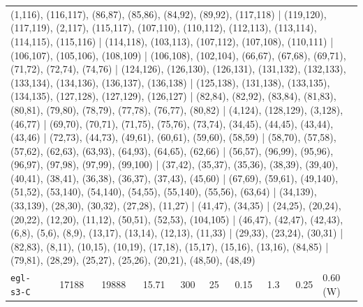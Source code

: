 \begin{longtable}{lrrrrrrrrl}
\multicolumn{10}{p{0.96\linewidth}}{\tiny\raggedright\arraybackslash (1,116), (116,117), (86,87), (85,86), (84,92), (89,92), (117,118) | (119,120), (117,119), (2,117), (115,117), (107,110), (110,112), (112,113), (113,114), (114,115), (115,116) | (114,118), (103,113), (107,112), (107,108), (110,111) | (106,107), (105,106), (108,109) | (106,108), (102,104), (66,67), (67,68), (69,71), (71,72), (72,74), (74,76) | (124,126), (126,130), (126,131), (131,132), (132,133), (133,134), (134,136), (136,137), (136,138) | (125,138), (131,138), (133,135), (134,135), (127,128), (127,129), (126,127) | (82,84), (82,92), (83,84), (81,83), (80,81), (79,80), (78,79), (77,78), (76,77), (80,82) | (4,124), (128,129), (3,128), (46,77) | (69,70), (70,71), (71,75), (75,76), (73,74), (34,45), (44,45), (43,44), (43,46) | (72,73), (44,73), (49,61), (60,61), (59,60), (58,59) | (58,70), (57,58), (57,62), (62,63), (63,93), (64,93), (64,65), (62,66) | (56,57), (96,99), (95,96), (96,97), (97,98), (97,99), (99,100) | (37,42), (35,37), (35,36), (38,39), (39,40), (40,41), (38,41), (36,38), (36,37), (37,43), (45,60) | (67,69), (59,61), (49,140), (51,52), (53,140), (54,140), (54,55), (55,140), (55,56), (63,64) | (34,139), (33,139), (28,30), (30,32), (27,28), (11,27) | (41,47), (34,35) | (24,25), (20,24), (20,22), (12,20), (11,12), (50,51), (52,53), (104,105) | (46,47), (42,47), (42,43), (6,8), (5,6), (8,9), (13,17), (13,14), (12,13), (11,33) | (29,33), (23,24), (30,31) | (82,83), (8,11), (10,15), (10,19), (17,18), (15,17), (15,16), (13,16), (84,85) | (79,81), (28,29), (25,27), (25,26), (20,21), (48,50), (48,49)} \\[2pt]
\texttt{egl-s3-C} & 17188 & 19888 & 15.71 & 300 & 25 & 0.15 & 1.3 & 0.25 & 0.60\,(W) \\

\end{longtable}
